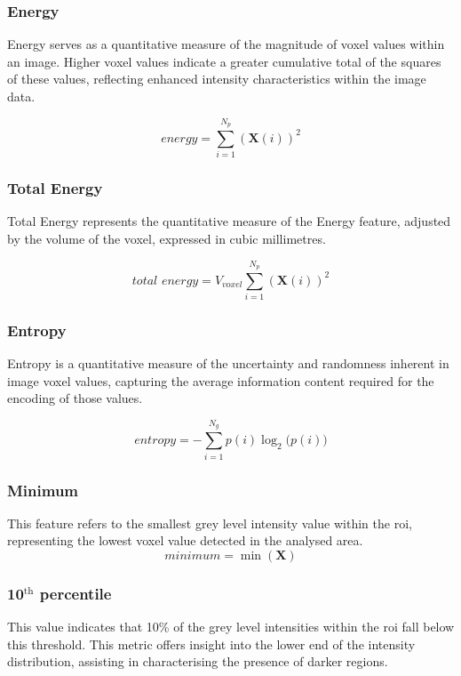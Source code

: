 \subsubsection*{Energy}
Energy serves as a quantitative measure of the magnitude of voxel values within an image. Higher voxel values indicate a greater cumulative total of the squares of these values, reflecting enhanced intensity characteristics within the image data.

\begin{equation}
    \textit{energy} = \displaystyle\sum^{N_p}_{i=1}{(\textbf{X}(i))^2}
\end{equation}

\subsubsection*{Total Energy}
Total Energy represents the quantitative measure of the Energy feature, adjusted by the volume of the voxel, expressed in cubic millimetres.

\begin{equation}
    \textit{total energy} = V_{voxel}\displaystyle\sum^{N_p}_{i=1}{(\textbf{X}(i))^2}
\end{equation}

\subsubsection*{Entropy}
Entropy is a quantitative measure of the uncertainty and randomness inherent in image voxel values, capturing the average information content required for the encoding of those values.

\begin{equation}
    \textit{entropy} = -\displaystyle\sum^{N_g}_{i=1}{p(i)\log_2\big(p(i)\big)}
\end{equation}

\subsubsection*{Minimum}
This feature refers to the smallest grey level intensity value within the \ac{roi}, representing the lowest voxel value detected in the analysed area.  
\begin{equation}
    \textit{minimum} = \min(\textbf{X})
\end{equation}

\subsubsection*{10$^{\text{th}}$ percentile}
This value indicates that 10\% of the grey level intensities within the \ac{roi} fall below this threshold.
This metric offers insight into the lower end of the intensity distribution, assisting in characterising the presence of darker regions. 


